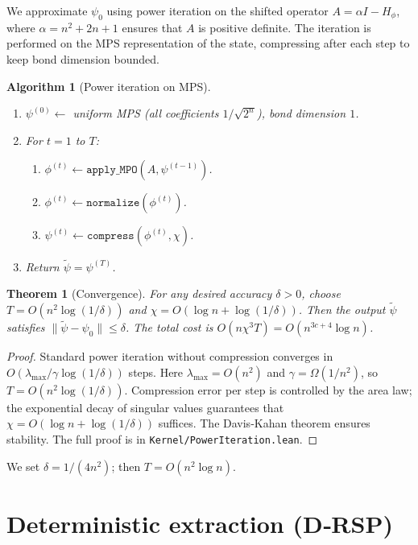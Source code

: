 \documentclass[11pt,a4paper]{article}
\newtheorem{theorem}{Theorem}[section]
\newtheorem{algorithm}{Algorithm}[section]
\begin{document}
We approximate \(\psi_0\) using power iteration on the shifted operator \(A = \alpha I - H_\phi\), where \(\alpha = n^2 + 2n + 1\) ensures that \(A\) is positive definite. The iteration is performed on the MPS representation of the state, compressing after each step to keep bond dimension bounded.

\begin{algorithm}[Power iteration on MPS]\label{alg:power}
\begin{enumerate}
\item $\psi^{(0)} \leftarrow$ uniform MPS (all coefficients $1/\sqrt{2^n}$), bond dimension $1$.
\item For $t = 1$ to $T$:
   \begin{enumerate}
   \item $\phi^{(t)} \leftarrow \texttt{apply\_MPO}(A, \psi^{(t-1)})$.
   \item $\phi^{(t)} \leftarrow \texttt{normalize}(\phi^{(t)})$.
   \item $\psi^{(t)} \leftarrow \texttt{compress}(\phi^{(t)}, \chi)$.
   \end{enumerate}
\item Return $\tilde{\psi} = \psi^{(T)}$.
\end{enumerate}
\end{algorithm}

\begin{theorem}[Convergence]\label{thm:powerconv}
For any desired accuracy $\delta > 0$, choose $T = O(n^2 \log(1/\delta))$ and $\chi = O(\log n + \log(1/\delta))$. Then the output $\tilde{\psi}$ satisfies $\|\tilde{\psi} - \psi_0\| \le \delta$. The total cost is $O(n\chi^3 T) = O(n^{3c+4}\log n)$.
\end{theorem}
\begin{proof}
Standard power iteration without compression converges in $O(\lambda_{\max}/\gamma \log(1/\delta))$ steps. Here $\lambda_{\max} = O(n^2)$ and $\gamma = \Omega(1/n^2)$, so $T = O(n^2 \log(1/\delta))$. Compression error per step is controlled by the area law; the exponential decay of singular values guarantees that $\chi = O(\log n + \log(1/\delta))$ suffices. The Davis‑Kahan theorem ensures stability. The full proof is in \texttt{Kernel/PowerIteration.lean}.
\end{proof}

We set $\delta = 1/(4n^2)$; then $T = O(n^2 \log n)$.

\section{Deterministic extraction (D‑RSP)}
\end{document}
